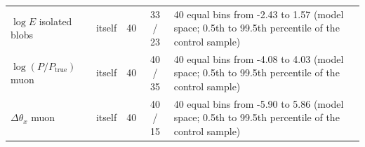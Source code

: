 \begin{tabular}{llccl}
$\log E$ isolated blobs & itself & 40 & 33 / 23 & \parbox[t]{7.5cm}{\raggedright\footnotesize 40 equal bins from -2.43 to 1.57 (model space; 0.5th to 99.5th percentile of the control sample)} \\
$\log(P/P_\mathrm{true})$ muon & itself & 40 & 40 / 35 & \parbox[t]{7.5cm}{\raggedright\footnotesize 40 equal bins from -4.08 to 4.03 (model space; 0.5th to 99.5th percentile of the control sample)} \\
$\Delta\theta_x$ muon & itself & 40 & 40 / 15 & \parbox[t]{7.5cm}{\raggedright\footnotesize 40 equal bins from -5.90 to 5.86 (model space; 0.5th to 99.5th percentile of the control sample)} \\
\bottomrule
\end{tabular}
